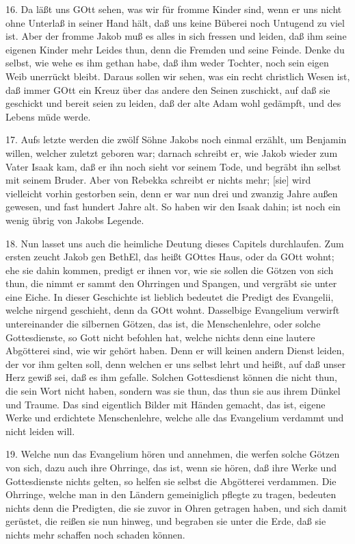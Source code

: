 16. Da läßt uns GOtt sehen, was wir für fromme Kinder sind, wenn er uns nicht ohne Unterlaß in seiner Hand hält, daß uns keine Büberei noch Untugend zu viel ist. Aber der fromme Jakob muß es alles in sich fressen und leiden, daß ihm seine eigenen Kinder mehr Leides thun, denn die Fremden und seine Feinde. Denke du selbst, wie wehe es ihm gethan habe, daß ihm weder Tochter, noch sein eigen Weib unerrückt bleibt. Daraus sollen wir sehen, was ein recht christlich Wesen ist, daß immer GOtt ein Kreuz über das andere den Seinen zuschickt, auf daß sie geschickt und bereit seien zu leiden, daß der alte Adam wohl gedämpft, und des Lebens müde werde.

17. Aufs letzte werden die zwölf Söhne Jakobs noch einmal erzählt, um Benjamin willen, welcher zuletzt geboren war; darnach schreibt er, wie Jakob wieder zum Vater Isaak kam, daß er ihn noch sieht vor seinem Tode, und begräbt ihn selbst mit seinem Bruder. Aber von Rebekka schreibt er nichts mehr; [sie] wird vielleicht vorhin gestorben sein, denn er war nun drei und zwanzig Jahre außen gewesen, und fast hundert Jahre alt. So haben wir den Isaak dahin; ist noch ein wenig übrig von Jakobs Legende.

18. Nun lasset uns auch die heimliche Deutung dieses Capitels durchlaufen. Zum ersten zeucht Jakob gen BethEl, das heißt GOttes Haus, oder da GOtt wohnt; ehe sie dahin kommen, predigt er ihnen vor, wie sie sollen die Götzen von sich thun, die nimmt er sammt den Ohrringen und Spangen, und vergräbt sie unter eine Eiche. In dieser Geschichte ist lieblich bedeutet die Predigt des Evangelii, welche nirgend geschieht, denn da GOtt wohnt. Dasselbige Evangelium verwirft untereinander die silbernen Götzen, das ist, die Menschenlehre, oder solche Gottesdienste, so Gott nicht befohlen hat, welche nichts denn eine lautere Abgötterei sind, wie wir gehört haben. Denn er will keinen andern Dienst leiden, der vor ihm gelten soll, denn welchen er uns selbst lehrt und heißt, auf daß unser Herz gewiß sei, daß es ihm gefalle. Solchen Gottesdienst können die nicht thun, die sein Wort nicht haben, sondern was sie thun, das thun sie aus ihrem Dünkel und Traume. Das sind eigentlich Bilder mit Händen gemacht, das ist, eigene Werke und erdichtete Menschenlehre, welche alle das Evangelium verdammt und nicht leiden will.

19. Welche nun das Evangelium hören und annehmen, die werfen solche Götzen von sich, dazu auch ihre Ohrringe, das ist, wenn sie hören, daß ihre Werke und Gottesdienste nichts gelten, so helfen sie selbst die Abgötterei verdammen. Die Ohrringe, welche man in den Ländern gemeiniglich pflegte zu tragen, bedeuten nichts denn die Predigten, die sie zuvor in Ohren getragen haben, und sich damit gerüstet, die reißen sie nun hinweg, und begraben sie unter die Erde, daß sie nichts mehr schaffen noch schaden können.

